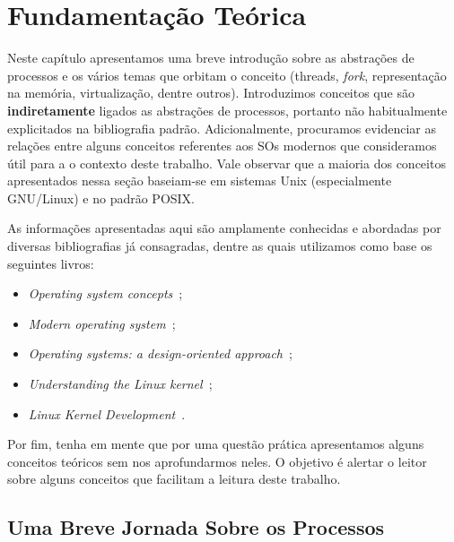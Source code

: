 \chapter{Fundamentação Teórica}
\label{cap:fundamentacao}

Neste capítulo apresentamos uma breve introdução sobre as abstrações de
processos e os vários temas que orbitam o conceito (threads, \emph{fork},
representação na memória, virtualização, dentre outros). Introduzimos conceitos
que são \textbf{indiretamente} ligados as abstrações de processos, portanto não
habitualmente explicitados na bibliografia padrão. Adicionalmente,
procuramos evidenciar as relações entre alguns conceitos referentes aos SOs
modernos que consideramos útil para a o contexto deste trabalho. Vale observar
que a maioria dos conceitos apresentados nessa seção baseiam-se em sistemas
Unix (especialmente GNU/Linux) e no padrão POSIX.

As informações apresentadas aqui são amplamente conhecidas e abordadas por
diversas bibliografias já consagradas, dentre as quais utilizamos como base os
seguintes livros:

\begin{itemize}
  \item \textit{Operating system concepts}~\citep{silberschatz};
  \item \textit{Modern operating system}~\citep{tanenbaum};
  \item \textit{Operating systems: a design-oriented approach}~\citep{crowley};
  \item \textit{Understanding the Linux kernel}~\citep{entendendo_kernel};
  \item \textit{Linux Kernel Development}~\citep{love}.
\end{itemize}

Por fim, tenha em mente que por uma questão prática apresentamos alguns
conceitos teóricos sem nos aprofundarmos neles. O objetivo é alertar o leitor
sobre alguns conceitos que facilitam a leitura deste trabalho.

\section{Uma Breve Jornada Sobre os Processos}
\label{sec:processos-e-threads}


